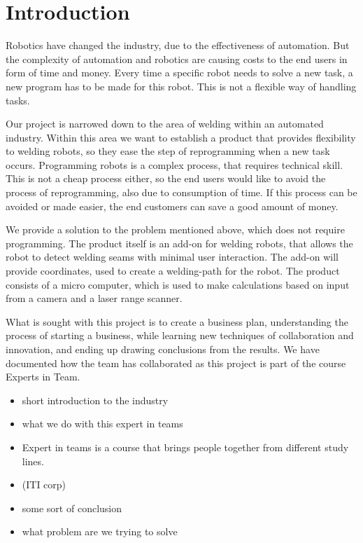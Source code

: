\section{Introduction}


Robotics have changed the industry, due to the effectiveness of automation. But the complexity of automation and robotics are causing costs to the end users in form of time and money. Every time a specific robot needs to solve a new task, a new program has to be made for this robot. This is not a flexible way of handling tasks. 

Our project is narrowed down to the area of welding within an automated industry. Within this area we want to establish a product that provides flexibility to welding robots, so they ease the step of reprogramming when a new task occurs. Programming robots is a complex process, that requires technical skill. This is not a cheap process either, so the end users would like to avoid the process of reprogramming, also due to consumption of time. If this process can be avoided or made easier, the end customers can save a good amount of money. 

We provide a solution to the problem mentioned above, which does not require programming. The product itself is an add-on for welding robots, that allows the robot to detect welding seams with minimal user interaction. The add-on will provide coordinates, used to create a welding-path for the robot. 
The product consists of a micro computer, which is used to make calculations based on input from a camera and a laser range scanner. 

What is sought with this project is to create a business plan, understanding the process of starting a business, while learning new techniques of collaboration and innovation, and ending up drawing conclusions from the results.
We have documented how the team has collaborated as this project is part of the course Experts in Team.

\begin{itemize}
\item short introduction to the industry
\item what we do with this expert in teams
\item Expert in teams is a course that brings people together from different study lines. 
\item (ITI corp)
\item some sort of conclusion
\item what problem are we trying to solve
\end{itemize}

